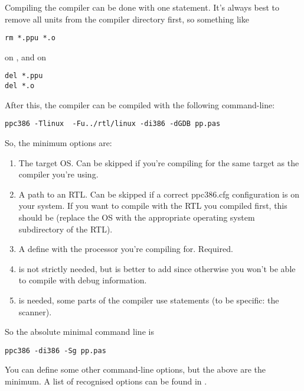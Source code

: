Compiling the compiler can be done with one statement. It's always best to
remove all units from the compiler directory first, so something like
\begin{verbatim}
rm *.ppu *.o
\end{verbatim}
on \linux, and on \dos
\begin{verbatim}
del *.ppu
del *.o
\end{verbatim}
After this, the compiler can be compiled with the following command-line:
\begin{verbatim}
ppc386 -Tlinux  -Fu../rtl/linux -di386 -dGDB pp.pas
\end{verbatim}
So, the minimum options are:
\begin{enumerate}
\item The target OS. Can be skipped if you're compiling for the same target as
the compiler you're using.
\item A path to an RTL. Can be skipped if a correct ppc386.cfg configuration
is on your system. If you want to compile with the RTL you compiled first,
this should be  (replace the OS with the appropriate
operating system subdirectory of the RTL).
\item A define with the processor you're compiling for. Required.
\item {} is not strictly needed, but is better to add since
otherwise you won't be able to compile with debug information.
\item {} is needed, some parts of the compiler use 
statements (to be specific: the scanner).
\end{enumerate}
So the absolute minimal command line is
\begin{verbatim}
ppc386 -di386 -Sg pp.pas
\end{verbatim}

You can define some other command-line options, but the above are the
minimum. A list of recognised options can be found in .


